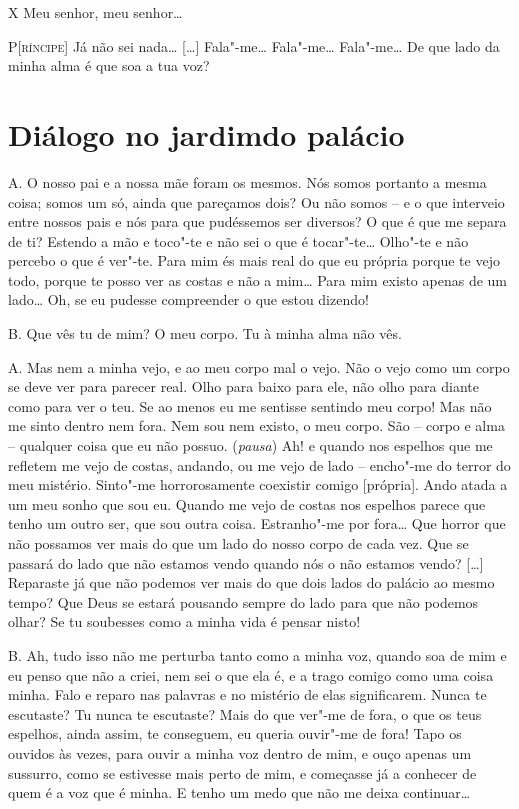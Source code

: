 \textsc{X} Meu senhor, meu senhor\ldots{}

\textsc{P[ríncipe]} Já não sei nada\ldots{} [\ldots{}] Fala"-me\ldots{} Fala"-me\ldots{} Fala"-me\ldots{}
De que lado da minha alma é que soa a tua voz?


\chapter[Diálogo no jardim do palácio]{Diálogo no jardim\break do palácio}

\textsc{A.} O nosso pai e a nossa mãe foram os mesmos. Nós somos portanto a
mesma coisa; somos um só, ainda que pareçamos dois? Ou não somos -- e
o que interveio entre nossos pais e nós para que pudéssemos ser
diversos? O que é que me separa de ti? Estendo a mão e toco"-te e não
sei o que é tocar"-te\ldots{} Olho"-te e não percebo o que é ver"-te. Para
mim és mais real do que eu própria porque te vejo todo, porque te
posso ver as costas e não a mim\ldots{} Para mim existo apenas de um
lado\ldots{} Oh, se eu pudesse compreender o que estou dizendo!

\textsc{B.} Que vês tu de mim? O meu corpo. Tu à minha alma não vês.

\textsc{A.} Mas nem a minha vejo, e ao meu corpo mal o vejo. Não o vejo como um
corpo se deve ver para parecer real. Olho para baixo para ele, não
olho para diante como para ver o teu. Se ao menos eu me sentisse
sentindo meu corpo! Mas não me sinto dentro nem fora. Nem sou nem
existo, o meu corpo. São -- corpo e alma -- qualquer coisa que eu não
possuo. (\textit{pausa}) Ah! e quando nos espelhos que me refletem me
vejo de costas, andando, ou me vejo de lado -- encho"-me do terror do
meu mistério. Sinto"-me horrorosamente coexistir comigo [própria].
Ando atada a um meu sonho que sou eu. Quando me vejo de costas nos
espelhos parece que tenho um outro ser, que sou outra coisa.
Estranho"-me por fora\ldots{} Que horror que não possamos ver mais do que
um lado do nosso corpo de cada vez. Que se passará do lado que não
estamos vendo quando nós o não estamos vendo? [\ldots{}] Reparaste já que
não podemos ver mais do que dois lados do palácio ao mesmo tempo? Que
Deus se estará pousando sempre do lado para que não podemos olhar? Se
tu soubesses como a minha vida é pensar nisto! 

\textsc{B.} Ah, tudo isso não me perturba tanto como a minha voz, quando soa de
mim e eu penso que não a criei, nem sei o que ela é, e a trago comigo
como uma coisa minha. Falo e reparo nas palavras e no mistério de
elas significarem. Nunca te escutaste? Tu nunca te escutaste? Mais do
que ver"-me de fora, o que os teus espelhos, ainda assim, te
conseguem, eu queria ouvir"-me de fora! Tapo os ouvidos às vezes, para
ouvir a minha voz dentro de mim, e ouço apenas um sussurro, como se
estivesse mais perto de mim, e começasse já a conhecer de quem é a
voz que é minha. E tenho um medo que não me deixa continuar\ldots{}

